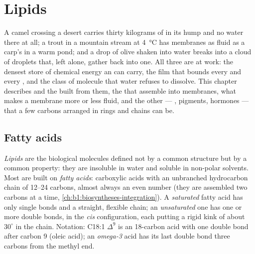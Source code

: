\chapter{Lipids}\label{ch:b1:lipids}

A camel crossing a desert carries thirty kilograms of  in its hump
and no water there at all; a trout in a mountain stream at
\qty{4}{\celsius} has membranes as fluid as a carp's in a warm pond;
and a drop of olive  shaken into water breaks into a cloud of
droplets that, left alone, gather back into one. All three are 
at work: the densest store of chemical energy an  can carry,
the film that bounds every  and every , and the class of
molecule that water refuses to dissolve. This chapter describes  and the  built from them, the   that
assemble into membranes, what makes a membrane more or less fluid, and
the other  --- , pigments, hormones --- that a few carbons
arranged in rings and chains can be.

\section{Fatty acids}

\begin{definition}\label{def:b1:lipids:fattyacid}
\emph{Lipids} are the biological molecules defined not by
a common structure but by a common property: they are insoluble in
water and soluble in non-polar solvents. Most are built on
\emph{fatty acids}: carboxylic acids with an
unbranched hydrocarbon chain of \qtyrange{12}{24}{} carbons, almost
always an even number (they are assembled two carbons at a time,
\cref{ch:b1:biosyntheses-integration}). A \emph{saturated} fatty acid has only single bonds and a straight, flexible
chain; an \emph{unsaturated} one has one
or more double bonds, in the \emph{cis} configuration, each putting a
rigid kink of about $30^\circ$ in the chain. Notation: C18:1 $\Delta^9$
is an 18-carbon acid with one double bond after carbon 9 (oleic acid);
an \emph{omega-3} acid has its last double bond three carbons from the
methyl end.
\end{definition}

